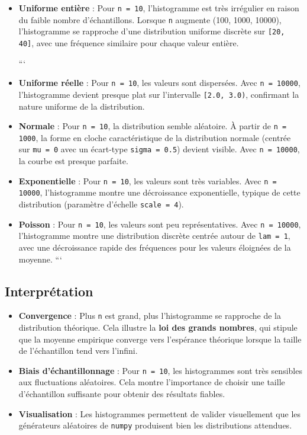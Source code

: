 \documentclass{article}
\begin{document}
\begin{itemize}  
    \item \textbf{Uniforme entière} : Pour \texttt{n = 10}, l'histogramme est très irrégulier en raison du faible nombre d'échantillons. Lorsque \texttt{n} augmente (100, 1000, 10000), l'histogramme se rapproche d'une distribution uniforme discrète sur \texttt{[20, 40]}, avec une fréquence similaire pour chaque valeur entière.

```
\item \textbf{Uniforme réelle} : Pour \texttt{n = 10}, les valeurs sont dispersées. Avec \texttt{n = 10000}, l'histogramme devient presque plat sur l'intervalle \texttt{[2.0, 3.0)}, confirmant la nature uniforme de la distribution.

\item \textbf{Normale} : Pour \texttt{n = 10}, la distribution semble aléatoire. À partir de \texttt{n = 1000}, la forme en cloche caractéristique de la distribution normale (centrée sur \texttt{mu = 0} avec un écart-type \texttt{sigma = 0.5}) devient visible. Avec \texttt{n = 10000}, la courbe est presque parfaite.

\item \textbf{Exponentielle} : Pour \texttt{n = 10}, les valeurs sont très variables. Avec \texttt{n = 10000}, l'histogramme montre une décroissance exponentielle, typique de cette distribution (paramètre d'échelle \texttt{scale = 4}).

\item \textbf{Poisson} : Pour \texttt{n = 10}, les valeurs sont peu représentatives. Avec \texttt{n = 10000}, l'histogramme montre une distribution discrète centrée autour de \texttt{lam = 1}, avec une décroissance rapide des fréquences pour les valeurs éloignées de la moyenne.
```

\end{itemize}

\subsection{Interprétation}  
\begin{itemize}  
    \item \textbf{Convergence} : Plus \texttt{n} est grand, plus l'histogramme se rapproche de la distribution théorique. Cela illustre la \textbf{loi des grands nombres}, qui stipule que la moyenne empirique converge vers l'espérance théorique lorsque la taille de l'échantillon tend vers l'infini.  
    \item \textbf{Biais d'échantillonnage} : Pour \texttt{n = 10}, les histogrammes sont très sensibles aux fluctuations aléatoires. Cela montre l'importance de choisir une taille d'échantillon suffisante pour obtenir des résultats fiables.  
    \item \textbf{Visualisation} : Les histogrammes permettent de valider visuellement que les générateurs aléatoires de \texttt{numpy} produisent bien les distributions attendues.  
\end{itemize}
\end{document}
